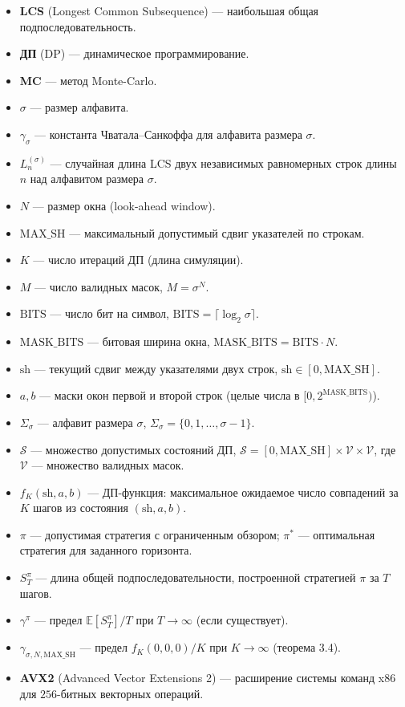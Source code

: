 \begin{itemize}[leftmargin=0pt, itemindent=\parindent]
    \item[] \textbf{LCS} (Longest Common Subsequence) --- наибольшая общая подпоследовательность.
    \item[] \textbf{ДП} (DP) --- динамическое программирование.
    \item[] \textbf{MC} --- метод Monte-Carlo.
    \item[] $\sigma$ --- размер алфавита.
    \item[] $\gamma_\sigma$ --- константа Чватала--Санкоффа для алфавита размера $\sigma$.
    \item[] $L_n^{(\sigma)}$ --- случайная длина LCS двух независимых равномерных строк длины $n$ над алфавитом размера $\sigma$.
    \item[] $N$ --- размер окна (look-ahead window).
    \item[] $\mathrm{MAX\_SH}$ --- максимальный допустимый сдвиг указателей по строкам.
    \item[] $K$ --- число итераций ДП (длина симуляции).
    \item[] $M$ --- число валидных масок, $M = \sigma^N$.
    \item[] $\mathrm{BITS}$ --- число бит на символ, $\mathrm{BITS} = \lceil \log_2 \sigma \rceil$.
    \item[] $\mathrm{MASK\_BITS}$ --- битовая ширина окна, $\mathrm{MASK\_BITS} = \mathrm{BITS} \cdot N$.
    \item[] $\mathrm{sh}$ --- текущий сдвиг между указателями двух строк, $\mathrm{sh} \in [0, \mathrm{MAX\_SH}]$.
    \item[] $a, b$ --- маски окон первой и второй строк (целые числа в $[0, 2^{\mathrm{MASK\_BITS}})$).
    \item[] $\Sigma_\sigma$ --- алфавит размера $\sigma$, $\Sigma_\sigma = \{0, 1, \ldots, \sigma-1\}$.
    \item[] $\mathcal{S}$ --- множество допустимых состояний ДП, $\mathcal{S} = [0, \mathrm{MAX\_SH}] \times \mathcal{V} \times \mathcal{V}$, где $\mathcal{V}$ --- множество валидных масок.
    \item[] $f_K(\mathrm{sh}, a, b)$ --- ДП-функция: максимальное ожидаемое число совпадений за $K$ шагов из состояния $(\mathrm{sh}, a, b)$.
    \item[] $\pi$ --- допустимая стратегия с ограниченным обзором; $\pi^\ast$ --- оптимальная стратегия для заданного горизонта.
    \item[] $S_T^\pi$ --- длина общей подпоследовательности, построенной стратегией $\pi$ за $T$ шагов.
    \item[] $\gamma^\pi$ --- предел $\mathbb{E}[S_T^\pi]/T$ при $T \to \infty$ (если существует).
    \item[] $\gamma_{\sigma, N, \mathrm{MAX\_SH}}$ --- предел $f_K(0, 0, 0)/K$ при $K \to \infty$ (теорема 3.4).
    \item[] \textbf{AVX2} (Advanced Vector Extensions 2) --- расширение системы команд x86 для $256$-битных векторных операций.
\end{itemize}
